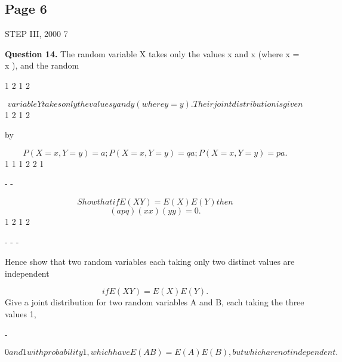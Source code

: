 \documentclass[12pt]{article}
\begin{document}
\subsection*{Page 6}
\begin{flushleft}
STEP III, 2000 7\par
\bigskip\textbf{Question 14.} The random variable X takes only the values x and x (where x = x ), and the random\par
1 2 1 2\par
\[variable Y takes only the values y and y (where y = y ). Their joint distribution is given\]
1 2 1 2\par
by\par
\[P(X = x , Y = y ) = a ; P(X = x , Y = y ) = q a ; P(X = x , Y = y ) = p a .\]
1 1 1 2 2 1\par
- -\par
\[Show that if E(XY ) = E(X)E(Y ) then\]
\[(a pq)(x x )(y y ) = 0.\]
1 2 1 2\par
- - -\par
Hence show that two random variables each taking only two distinct values are independent\par
\[if E(XY ) = E(X)E(Y ).\]
Give a joint distribution for two random variables A and B, each taking the three values 1,\par
-\par
\[0 and 1 with probability 1 , which have E(AB) = E(A)E(B), but which are not independent.\]
\end{flushleft}
\end{document}
